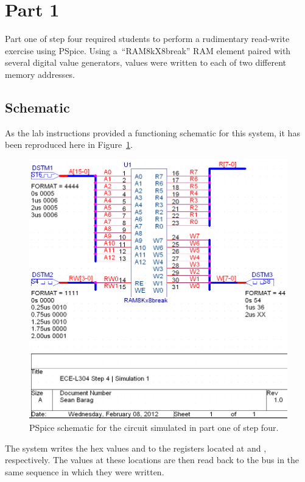\section{Part 1}

Part one of step four required students to perform a rudimentary read-write
exercise using PSpice.  Using a~``RAM8kX8break'' RAM element paired with
several digital value generators, values were written to each of two different
memory addresses.

\subsection{Schematic}
As the lab instructions provided a functioning schematic for this system, it
has been reproduced here in Figure~\ref{f:schem1}.
%
\begin{figure}[H]
\centering
	\includegraphics[width=.8\textwidth]{img/shot/schem1.png}
	\parbox{.8\textwidth}{
	\caption[Part 1 Schematic]{PSpice schematic for the circuit simulated in
	part one of step four.}
	\label{f:schem1}}
\end{figure}
%
The system writes the hex values  and  to the registers
located at  and , respectively.  The values at these
locations are then read back to the  bus in the same sequence in which
they were written.

